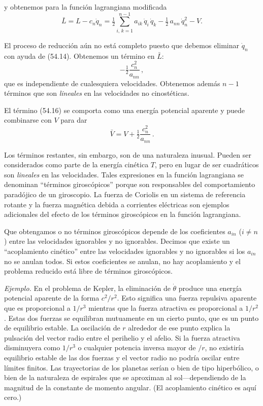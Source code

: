 \documentclass[12pt,a4paper]{book}
\begin{document}

y obtenemos para la función lagrangiana modificada
\begin{equation}
\bar{L} = L - c_n \dot{q}_n = \tfrac{1}{2} \sum_{i,\,k=1}^{n-1} a_{ik}\,\dot{q}_i\,\dot{q}_k - \tfrac{1}{2}\,a_{nn}\,\dot{q}_n^2 - V. \tag{54.15}
\end{equation}

El proceso de reducción aún no está completo puesto que debemos eliminar $\dot{q}_n$ con ayuda de (54.14). Obtenemos un término en $\bar{L}$:
\begin{equation}
-\tfrac{1}{2}\frac{c_n^2}{a_{nn}}\,, \tag{54.16}
\end{equation}
que es independiente de cualesquiera velocidades. Obtenemos además $n-1$ términos que son \textit{lineales} en las velocidades no cinostéticas.

El término (54.16) se comporta como una energía potencial aparente y puede combinarse con $V$ para dar
\begin{equation}
\bar{V} = V + \tfrac{1}{2}\frac{c_n^2}{a_{nn}}\,. \tag{54.17}
\end{equation}

Los términos restantes, sin embargo, son de una naturaleza inusual. Pueden ser considerados como parte de la energía cinética $T$, pero en lugar de ser cuadráticos son \textit{lineales} en las velocidades. Tales expresiones en la función lagrangiana se denominan ``términos giroscópicos'' porque son responsables del comportamiento paradójico de un giroscopio. La fuerza de Coriolis en un sistema de referencia rotante y la fuerza magnética debida a corrientes eléctricas son ejemplos adicionales del efecto de los términos giroscópicos en la función lagrangiana.

Que obtengamos o no términos giroscópicos depende de los coeficientes $a_{in}$ ($i \neq n$) entre las velocidades ignorables y no ignorables. Decimos que existe un ``acoplamiento cinético'' entre las velocidades ignorables y no ignorables si los $a_{in}$ no se anulan todos. Si estos coeficientes se anulan, no hay acoplamiento y el problema reducido está libre de términos giroscópicos.

\textit{Ejemplo.} En el problema de Kepler, la eliminación de $\dot{\theta}$ produce una energía potencial aparente de la forma $c^2/r^2$. Esto significa una fuerza repulsiva aparente que es proporcional a $1/r^3$ mientras que la fuerza atractiva es proporcional a $1/r^2$. Estas dos fuerzas se equilibran mutuamente en un cierto punto, que es un punto de equilibrio estable. La oscilación de $r$ alrededor de ese punto explica la pulsación del vector radio entre el perihelio y el afelio. Si la fuerza atractiva disminuyera como $1/r^3$ o cualquier potencia inversa mayor de $/r$, no existiría equilibrio estable de las dos fuerzas y el vector radio no podría oscilar entre límites finitos. Las trayectorias de los planetas serían o bien de tipo hiperbólico, o bien de la naturaleza de espirales que se aproximan al sol---dependiendo de la magnitud de la constante de momento angular. (El acoplamiento cinético es aquí cero.)
\end{document}
